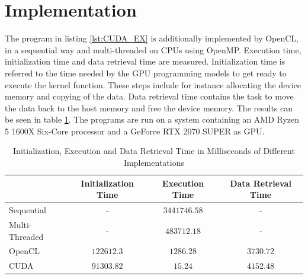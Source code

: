 \section{Implementation}
The program in listing \ref{lst:CUDA_EX} is additionally implemented by OpenCL, in a sequential way and multi-threaded on CPUs using OpenMP.
Execution time, initialization time and data retrieval time are measured.
Initialization time is referred to the time needed by the GPU programming models to get ready to execute the kernel function.
These steps include for instance allocating the device memory and copying of the data.
Data retrieval time contains the task to move the data back to the host memory and free the device memory.
The results can be seen in table \ref{tab:time}.
The programs are run on a system containing an AMD Ryzen 5 1600X Six-Core processor and a GeForce RTX 2070 SUPER as GPU.
\begin{table}[htbp]
  \centering
  \caption{Initialization, Execution and Data Retrieval Time in Milliseconds of Different Implementations}
  \label{tab:time}
  \begin{tabular}{|l|c|c|c|}
	\hline
	& Initialization Time & Execution Time & Data Retrieval Time \\\hline
	Sequential & \texttt{-} & \(3441746.58\) & \texttt{-} \\\hline
	Multi-Threaded & \texttt{-} & \(483712.18\) & \texttt{-} \\\hline
	OpenCL & \(122612.3\) & \(1286.28\) & \(3730.72\) \\\hline
	CUDA & \(91303.82\) & \(15.24\) & \(4152.48\) \\\hline
  \end{tabular}
\end{table}


